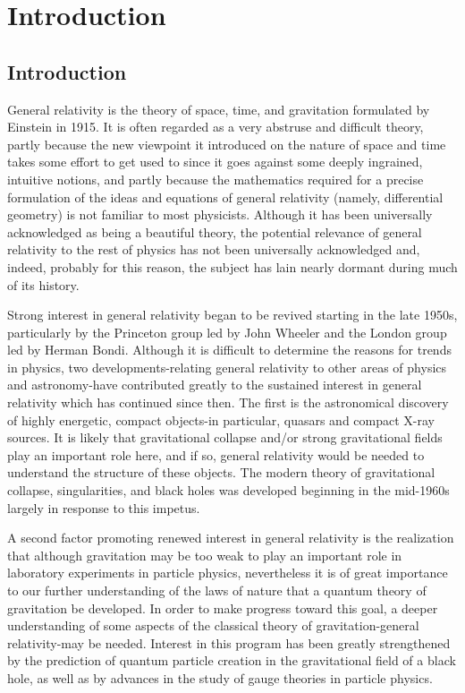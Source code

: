 \chapter{Introduction}
\section{Introduction}
General relativity is the theory of space, time, and gravitation formulated by Einstein in 1915. It is often regarded as a very abstruse and difficult theory, partly because the new viewpoint it introduced on the nature of space and time takes some effort to get used to since it goes against some deeply ingrained, intuitive notions, and partly because the mathematics required for a precise formulation of the ideas and equations of general relativity (namely, differential geometry) is not familiar to most physicists. Although it has been universally acknowledged as being a beautiful theory, the potential relevance of general relativity to the rest of physics has not been universally acknowledged and, indeed, probably for this reason, the subject has lain nearly dormant during much of its history.

Strong interest in general relativity began to be revived starting in the late 1950s, particularly by the Princeton group led by John Wheeler and the London group led by Herman Bondi. Although it is difficult to determine the reasons for trends in physics, two developments-relating general relativity to other areas of physics and astronomy-have contributed greatly to the sustained interest in general relativity which has continued since then. The first is the astronomical discovery of highly energetic, compact objects-in particular, quasars and compact X-ray sources. It is likely that gravitational collapse and/or strong gravitational fields play an important role here, and if so, general relativity would be needed to understand the structure of these objects. The modern theory of gravitational collapse, singularities, and black holes was developed beginning in the mid-1960s largely in response to this impetus. 

A second factor promoting renewed interest in general relativity is the realization that although gravitation may be too weak to play an important role in laboratory experiments in particle physics, nevertheless it is of great importance to our further understanding of the laws of nature that a quantum theory of gravitation be developed. In order to make progress toward this goal, a deeper understanding of some aspects of the classical theory of gravitation-general relativity-may be needed. Interest in this program has been greatly strengthened by the prediction of quantum particle creation in the gravitational field of a black hole, as well as by advances in the study of gauge theories in particle physics.

